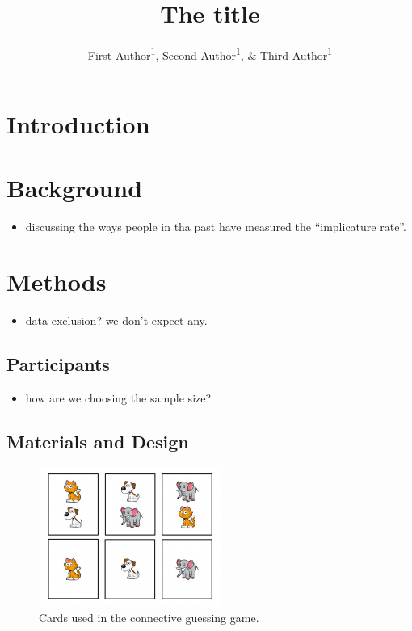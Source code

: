 \documentclass[man]{apa6}
\title{The title}
\author{First Author\textsuperscript{1}, Second Author\textsuperscript{1}, \& Third Author\textsuperscript{1}}
\affiliation{
    \vspace{0.5cm}
          \textsuperscript{1} Stanford University  }
\providecommand{\tightlist}{%
  \setlength{\itemsep}{0pt}\setlength{\parskip}{0pt}}
\theoremstyle{definition}
\theoremstyle{definition}
\theoremstyle{definition}
\theoremstyle{remark}
\begin{document}
\maketitle

\setcounter{secnumdepth}{0}



\section{Introduction}\label{introduction}

\section{Background}\label{background}

\begin{itemize}
\tightlist
\item
  discussing the ways people in tha past have measured the
  \enquote{implicature rate}.
\end{itemize}

\section{Methods}\label{methods}

\begin{itemize}
\tightlist
\item
  data exclusion? we don't expect any.
\end{itemize}

\subsection{Participants}\label{participants}

\begin{itemize}
\tightlist
\item
  how are we choosing the sample size?
\end{itemize}

\subsection{Materials and Design}\label{materials-and-design}

\begin{figure}[t]

{\centering \includegraphics{writeup_files/figure-latex/stimuli-1} 

}

\caption{Cards used in the connective guessing game.}\label{fig:stimuli}
\end{figure}
\end{document}
